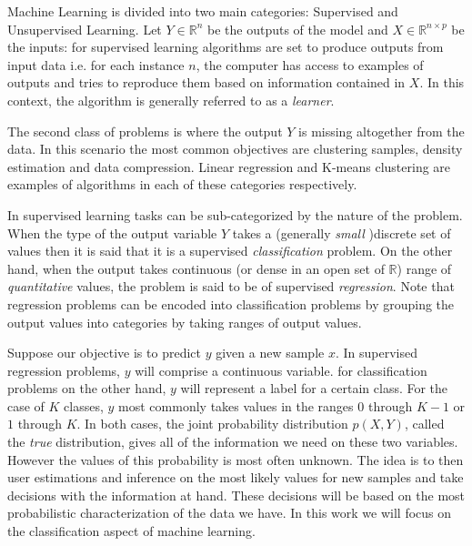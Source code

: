 Machine Learning is divided into two main categories: Supervised and Unsupervised Learning. Let $Y \in \mathbb{R}^n$ be the outputs of the model and $X \in \mathbb{R}^{n \times  p}$ be the inputs: for supervised learning algorithms are set to produce outputs from input data i.e. for each instance $n$, the computer has access to examples of outputs and tries to reproduce them based on information contained in $X$. In this context, the algorithm is generally referred to as a \textit{learner}.

The second class of problems is where the output $Y$ is missing altogether from the data. In this scenario the most common objectives are clustering samples, density estimation and data compression. Linear regression and K-means clustering are examples of algorithms in each of these categories respectively.

In supervised learning tasks can be sub-categorized by the nature of the problem. When the type of the output variable $Y$ takes a (generally \textit{small} )discrete set of values then it is said that it is a supervised \textit{classification} problem. On the other hand, when the output takes continuous (or dense in an open set of $\mathbb{R}$) range of \textit{quantitative} values, the problem is said to be of supervised \textit{regression}. Note that regression problems can be encoded into classification problems by grouping the output values into categories by taking ranges of output values.

Suppose our objective is to predict $y$ given a new sample $x$. In supervised regression problems, $y$ will comprise a continuous variable. for classification problems on the other hand, $y$ will represent a label for a certain class. For the case of $K$ classes, $y$ most commonly takes values in the ranges $0$ through $K-1$  or $1$ through $K$. In both cases, the joint probability distribution $p(X, Y)$, called the \textit{true} distribution, gives all of the information we need on these two variables. However the values of this probability is most often unknown. The idea is to then user estimations and inference on the most likely values for new samples and take decisions with the information at hand. These decisions will be based on the most probabilistic characterization of the data we have. In this work we will focus on the classification aspect of machine learning.

